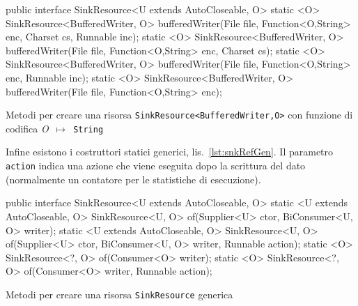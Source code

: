\begin{elisting}[!htb]
    \begin{javacode}
        public interface SinkResource<U extends AutoCloseable, O> {
    static <O> SinkResource<BufferedWriter, O> bufferedWriter(File file, Function<O,String> enc, Charset cs,
                                                              Runnable inc);
    static <O> SinkResource<BufferedWriter, O> bufferedWriter(File file, Function<O,String> enc, Charset cs);
    static <O> SinkResource<BufferedWriter, O> bufferedWriter(File file, Function<O,String> enc, Runnable inc);
    static <O> SinkResource<BufferedWriter, O> bufferedWriter(File file, Function<O,String> enc);
}
    \end{javacode}
    \caption[Metodi per creare una risorsa \texttt{SinkResource<BufferedWriter,O>}
    con funzione di codifica]{Metodi per creare una risorsa \texttt{SinkResource<BufferedWriter,O>}
    con funzione di codifica \textit{O}~$\mapsto$~\texttt{String}}
    \label{lst:snkRefBwEnc}
\end{elisting}

Infine esistono i costruttori statici generici, lis.~\ref{lst:snkRefGen}.
Il parametro \texttt{action} indica una azione che viene eseguita dopo la
scrittura del dato (normalmente un contatore per le statistiche di esecuzione).

\begin{elisting}[!htb]
    \begin{javacode}
        public interface SinkResource<U extends AutoCloseable, O> {
    static <U extends AutoCloseable, O> SinkResource<U, O> of(Supplier<U> ctor, BiConsumer<U, O> writer);
    static <U extends AutoCloseable, O> SinkResource<U, O> of(Supplier<U> ctor, BiConsumer<U, O> writer,
                                                              Runnable action);
    static <O> SinkResource<?, O> of(Consumer<O> writer);
    static <O> SinkResource<?, O> of(Consumer<O> writer, Runnable action);
}
    \end{javacode}
    \caption{Metodi per creare una risorsa \texttt{SinkResource} generica}
    \label{lst:snkRefGen}
\end{elisting}
